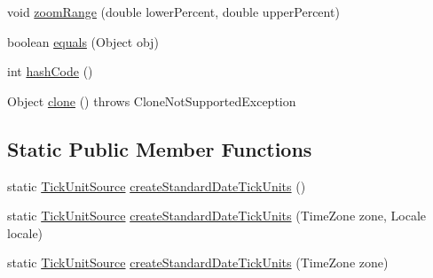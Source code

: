 \begin{DoxyCompactItemize}
\item 
void \mbox{\hyperlink{classorg_1_1jfree_1_1chart_1_1axis_1_1_date_axis_a5afc5e3182210cb2b5f1a71957527547}{zoom\+Range}} (double lower\+Percent, double upper\+Percent)
\item 
boolean \mbox{\hyperlink{classorg_1_1jfree_1_1chart_1_1axis_1_1_date_axis_a2ccf2581f794d97d5d8cce10ee02eb71}{equals}} (Object obj)
\item 
int \mbox{\hyperlink{classorg_1_1jfree_1_1chart_1_1axis_1_1_date_axis_afc9d0003678535ddcb88c63d0f4f094b}{hash\+Code}} ()
\item 
Object \mbox{\hyperlink{classorg_1_1jfree_1_1chart_1_1axis_1_1_date_axis_a0767de66ff74d3b4de2973877c8e9721}{clone}} ()  throws Clone\+Not\+Supported\+Exception 
\end{DoxyCompactItemize}
\subsection*{Static Public Member Functions}
\begin{DoxyCompactItemize}
\item 
static \mbox{\hyperlink{interfaceorg_1_1jfree_1_1chart_1_1axis_1_1_tick_unit_source}{Tick\+Unit\+Source}} \mbox{\hyperlink{classorg_1_1jfree_1_1chart_1_1axis_1_1_date_axis_a5ebf7393323897c1e51fef720227afe6}{create\+Standard\+Date\+Tick\+Units}} ()
\item 
static \mbox{\hyperlink{interfaceorg_1_1jfree_1_1chart_1_1axis_1_1_tick_unit_source}{Tick\+Unit\+Source}} \mbox{\hyperlink{classorg_1_1jfree_1_1chart_1_1axis_1_1_date_axis_aff43c1aad323f507597948df3ceea8c4}{create\+Standard\+Date\+Tick\+Units}} (Time\+Zone zone, Locale locale)
\item 
static \mbox{\hyperlink{interfaceorg_1_1jfree_1_1chart_1_1axis_1_1_tick_unit_source}{Tick\+Unit\+Source}} \mbox{\hyperlink{classorg_1_1jfree_1_1chart_1_1axis_1_1_date_axis_abcd4333dbc49642ee7dc4639c13a032c}{create\+Standard\+Date\+Tick\+Units}} (Time\+Zone zone)
\end{DoxyCompactItemize}
